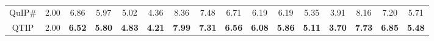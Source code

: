 \begin{table}[t]
\begin{tabular}{@{}cccccccccccccccc@{}}
\rowcolor[HTML]{D9D9D9} 
QuIP\#                            & \multicolumn{1}{c|}{\cellcolor[HTML]{D9D9D9}2.00} & 6.86          & 5.97          & 5.02          & \multicolumn{1}{c|}{\cellcolor[HTML]{D9D9D9}4.36}          & 8.36          & 7.48          & 6.71          & \multicolumn{1}{c|}{\cellcolor[HTML]{D9D9D9}6.19}          & 6.19          & 5.35          & \multicolumn{1}{c|}{\cellcolor[HTML]{D9D9D9}3.91}          & 8.16          & 7.20          & 5.71          \\
\rowcolor[HTML]{D9D9D9} 
QTIP                              & \multicolumn{1}{c|}{\cellcolor[HTML]{D9D9D9}2.00} & \textbf{6.52} & \textbf{5.80} & \textbf{4.83} & \multicolumn{1}{c|}{\cellcolor[HTML]{D9D9D9}\textbf{4.21}} & \textbf{7.99} & \textbf{7.31} & \textbf{6.56} & \multicolumn{1}{c|}{\cellcolor[HTML]{D9D9D9}\textbf{6.08}} & \textbf{5.86} & \textbf{5.11} & \multicolumn{1}{c|}{\cellcolor[HTML]{D9D9D9}\textbf{3.70}} & \textbf{7.73} & \textbf{6.85} & \textbf{5.48} \\ \bottomrule
\end{tabular}
\label{tab:hybft}
\end{table}



